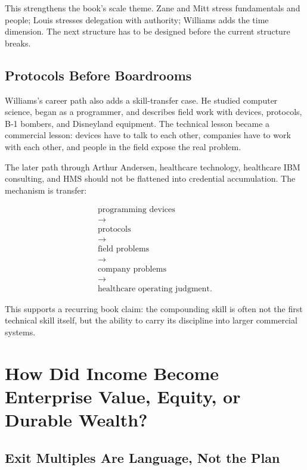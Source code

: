 \documentclass[11pt,oneside]{book}
\begin{document}
This strengthens the book's scale theme. Zane and Mitt stress fundamentals and people; Louis stresses delegation with authority; Williams adds the time dimension. The next structure has to be designed before the current structure breaks.

\section{Protocols Before Boardrooms}

Williams's career path also adds a skill-transfer case. He studied computer science, began as a programmer, and describes field work with devices, protocols, B-1 bombers, and Disneyland equipment. The technical lesson became a commercial lesson: devices have to talk to each other, companies have to work with each other, and people in the field expose the real problem.

The later path through Arthur Andersen, healthcare technology, healthcare IBM consulting, and HMS should not be flattened into credential accumulation. The mechanism is transfer:

\begin{equation}
\begin{gathered}
\text{programming devices}\\
\longrightarrow\\
\text{protocols}\\
\longrightarrow\\
\text{field problems}\\
\longrightarrow\\
\text{company problems}\\
\longrightarrow\\
\text{healthcare operating judgment}.
\end{gathered}
\end{equation}

This supports a recurring book claim: the compounding skill is often not the first technical skill itself, but the ability to carry its discipline into larger commercial systems.

\chapter{How Did Income Become Enterprise Value, Equity, or Durable Wealth?}

\section{Exit Multiples Are Language, Not the Plan}
\end{document}
